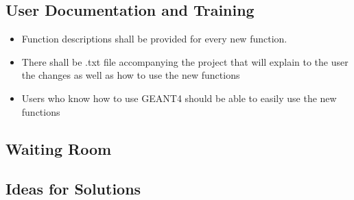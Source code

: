 \documentclass[12pt]{article}
\begin{document}
\subsection{User Documentation and Training} %
\begin{itemize}
	\item Function descriptions shall be provided for every new function. 
	\item There shall be .txt file accompanying the project that will explain to the user the changes as well as how to use the new functions
	\item Users who know how to use GEANT4 should be able to easily use the new functions
\end{itemize}

\subsection{Waiting Room} %

\subsection{Ideas for Solutions} %
\end{document}
